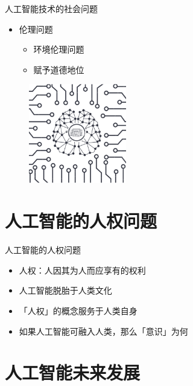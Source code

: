 \documentclass{beamer}
\begin{document}
\begin{frame}{人工智能技术的社会问题}
  \begin{itemize}
    \item 伦理问题 
      \begin{itemize}
       \item  环境伦理问题 
       \item  赋予道德地位
      \end{itemize}
  \end{itemize}

  \begin{figure}[H]
   \centering
   \includegraphics[height=1.7in]{zsjPic5.jpg}
   \end{figure}

\end{frame} 

  \section{人工智能的人权问题}
  \begin{frame}{人工智能的人权问题}
    \begin{itemize}
     \item 人权：人因其为人而应享有的权利
     \item 人工智能脱胎于人类文化
     \item 「人权」的概念服务于人类自身  
     \item 如果人工智能可融入人类，那么「意识」为何
    \end{itemize}
  \end{frame}

  \section{人工智能未来发展}
\end{document}
